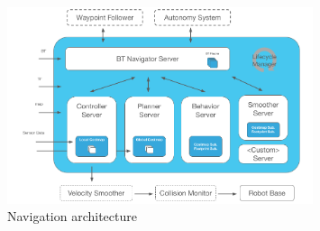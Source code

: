 \begin{figure}[h]
    \centering
    \includegraphics[width=0.8\textwidth]{images/nav2_architecture}
    \caption{Navigation architecture}
  
  \end{figure}
